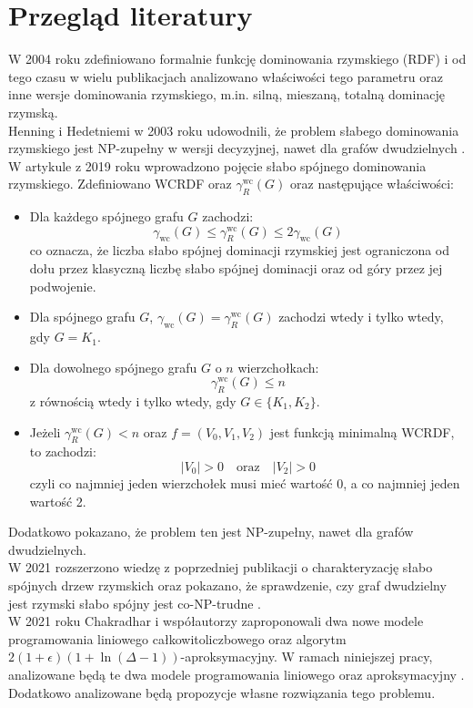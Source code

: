 \section{Przegląd literatury}
W 2004 roku zdefiniowano formalnie funkcję dominowania rzymskiego (RDF) \cite{RDF} i od tego czasu w wielu publikacjach analizowano właściwości tego parametru oraz inne wersje dominowania rzymskiego, m.in. silną, mieszaną, totalną dominację rzymską.\\ 
Henning i Hedetniemi w 2003 roku udowodnili, że problem słabego dominowania rzymskiego jest NP-zupełny w wersji decyzyjnej, nawet dla grafów dwudzielnych \cite{NEW_STRATEGY}. \\ 
W artykule z 2019 roku \cite{theoryWCRDF} wprowadzono pojęcie słabo spójnego dominowania rzymskiego. Zdefiniowano WCRDF oraz $\gamma_{R}^{\text{wc}}(G)$ oraz następujące właściwości:
\begin{itemize}
    \item Dla każdego spójnego grafu $G$ zachodzi:
    \[
    \gamma_{\text{wc}}(G) \leq \gamma_{R}^{\text{wc}}(G) \leq 2\gamma_{\text{wc}}(G)
    \]
    co oznacza, że liczba słabo spójnej dominacji rzymskiej jest ograniczona od dołu przez klasyczną liczbę słabo spójnej dominacji oraz od góry przez jej podwojenie.

    \item Dla spójnego grafu $G$, $\gamma_{\text{wc}}(G) = \gamma_{R}^{\text{wc}}(G)$ zachodzi wtedy i tylko wtedy, gdy $G = K_1$.

    \item Dla dowolnego spójnego grafu $G$ o $n$ wierzchołkach:
    \[
    \gamma_{R}^{\text{wc}}(G) \leq n
    \]
    z równością wtedy i tylko wtedy, gdy $G \in \{K_1, K_2\}$.

    \item Jeżeli $\gamma_{R}^{\text{wc}}(G) < n$ oraz $f = (V_0, V_1, V_2)$ jest funkcją minimalną WCRDF, to zachodzi:
    \[
    |V_0| > 0 \quad \text{oraz} \quad |V_2| > 0
    \]
    czyli co najmniej jeden wierzchołek musi mieć wartość 0, a co najmniej jeden wartość 2.
\end{itemize}
Dodatkowo pokazano, że problem ten jest NP-zupełny, nawet dla grafów dwudzielnych.\\
W 2021 rozszerzono wiedzę z poprzedniej publikacji o charakteryzację słabo spójnych drzew rzymskich oraz pokazano, że sprawdzenie, czy graf dwudzielny jest rzymski słabo spójny jest co-NP-trudne \cite{PROGRESS}.\\
W 2021 roku Chakradhar i współautorzy zaproponowali dwa nowe modele programowania liniowego całkowitoliczbowego oraz algorytm $2(1+\epsilon)(1 + \ln(\Delta - 1))$-aproksymacyjny. W ramach niniejszej pracy, analizowane będą te dwa modele programowania liniowego oraz aproksymacyjny \cite{ILP}. Dodatkowo analizowane będą propozycje własne rozwiązania tego problemu.\\
